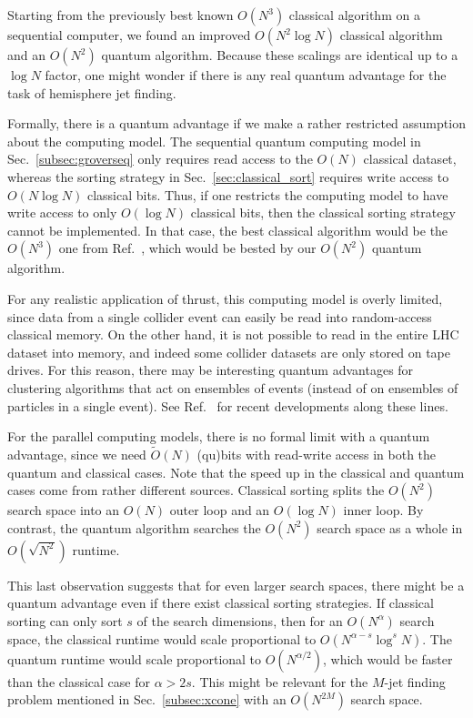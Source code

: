 \documentclass[aps,prd,twocolumn,superscriptaddress,preprintnumbers,nofootinbib,longbibliography,floatfix]{revtex4-1}
\DeclareRobustCommand{\Sec}[1]{Sec.~\ref{#1}}
\DeclareRobustCommand{\Ref}[1]{Ref.~\cite{#1}}
\begin{document}
Starting from the previously best known $O(N^3)$ classical algorithm on a sequential computer, we found an improved $O(N^2 \log N)$ classical algorithm and an $O(N^2)$ quantum algorithm.
%
Because these scalings are identical up to a $\log N$ factor, one might wonder if there is any real quantum advantage for the task of hemisphere jet finding.


Formally, there is a quantum advantage if we make a rather restricted assumption about the computing model.
%
The sequential quantum computing model in \Sec{subsec:groverseq} only requires read access to the $O(N)$ classical dataset, whereas the sorting strategy in \Sec{sec:classical_sort} requires write access to $O(N \log N)$ classical bits.
%
Thus, if one restricts the computing model to have write access to only $O(\log N)$ classical bits, then the classical sorting strategy cannot be implemented.
%
In that case, the best classical algorithm would be the $O(N^3)$ one from \Ref{Yamamoto:1984fd}, which would be bested by our $O(N^2)$ quantum algorithm.


For any realistic application of thrust, this computing model is overly limited, since data from a single collider event can easily be read into random-access classical memory.
%
On the other hand, it is not possible to read in the entire LHC dataset into memory, and indeed some collider datasets are only stored on tape drives.
%
For this reason, there may be interesting quantum advantages for clustering algorithms that act on ensembles of events (instead of on ensembles of particles in a single event).  
%
See \Ref{Komiske:2019fks} for recent developments along these lines.


For the parallel computing models, there is no formal limit with a quantum advantage, since we need $\widetilde{O}(N)$ (qu)bits with read-write access in
both the quantum and classical cases.
%
Note that the speed up in the classical and quantum cases come from rather different sources.
%
Classical sorting splits the $O(N^2)$ search space into an $O(N)$ outer loop and an $O(\log N)$ inner loop.
%
By contrast, the quantum algorithm searches the $O(N^2)$ search space as a whole in $O(\sqrt{N^2})$ runtime.


This last observation suggests that for even larger search spaces, there might be a quantum advantage even if there exist classical sorting strategies.
%
If classical sorting can only sort $s$ of the search dimensions, then for an $O(N^\alpha)$ search space, the classical runtime would scale proportional to $O(N^{\alpha - s} \log^s N)$.
%
The quantum runtime would scale proportional to $O(N^{\alpha/2})$, which would be faster than the classical case for $\alpha > 2s$.
%
This might be relevant for the $M$-jet finding problem mentioned in \Sec{subsec:xcone} with an $O(N^{2M})$ search space.
\end{document}

